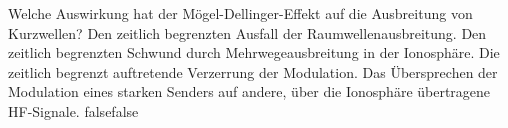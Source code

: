     {Welche Auswirkung hat der Mögel-Dellinger-Effekt auf die Ausbreitung von Kurzwellen?}
    {Den zeitlich begrenzten Ausfall der Raumwellenausbreitung.}
    {Den zeitlich begrenzten Schwund durch Mehrwegeausbreitung in der Ionosphäre.}
    {Die zeitlich begrenzt auftretende Verzerrung der Modulation.}
    {Das Übersprechen der Modulation eines starken Senders auf andere, über die Ionosphäre übertragene HF-Signale.}
    {false}{false}